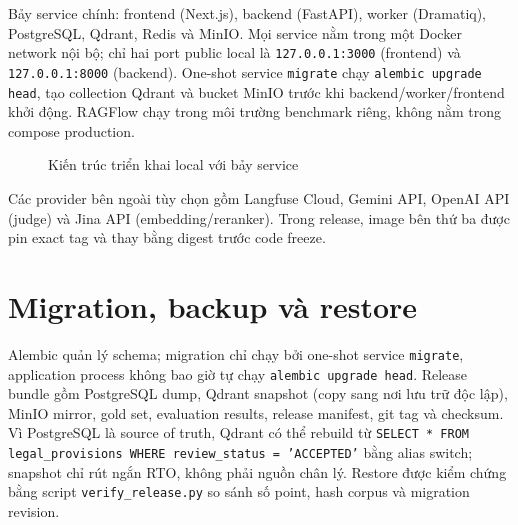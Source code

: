 \documentclass[a4paper,12pt]{extreport}
\newcommand{\code}[1]{\texttt{#1}}
\begin{document}
\begin{sloppypar}
Bảy service chính: frontend (Next.js), backend (FastAPI), worker (Dramatiq), PostgreSQL, Qdrant, Redis và MinIO. Mọi service nằm trong một Docker network nội bộ; chỉ hai port public local là \code{127.0.0.1:3000} (frontend) và \code{127.0.0.1:8000} (backend). One-shot service \code{migrate} chạy \code{alembic upgrade head}, tạo collection Qdrant và bucket MinIO trước khi backend/worker/frontend khởi động. RAGFlow chạy trong môi trường benchmark riêng, không nằm trong compose production.
\end{sloppypar}

\begin{figure}[H]
\centering
{}
\caption{Kiến trúc triển khai local với bảy service}
\end{figure}

Các provider bên ngoài tùy chọn gồm Langfuse Cloud, Gemini API, OpenAI API (judge) và Jina API (embedding/reranker). Trong release, image bên thứ ba được pin exact tag và thay bằng digest trước code freeze.

\section{Migration, backup và restore}

\begin{sloppypar}
Alembic quản lý schema; migration chỉ chạy bởi one-shot service \code{migrate}, application process không bao giờ tự chạy \code{alembic upgrade head}. Release bundle gồm PostgreSQL dump, Qdrant snapshot (copy sang nơi lưu trữ độc lập), MinIO mirror, gold set, evaluation results, release manifest, git tag và checksum. Vì PostgreSQL là source of truth, Qdrant có thể rebuild từ \code{SELECT * FROM legal\_provisions WHERE review\_status = 'ACCEPTED'} bằng alias switch; snapshot chỉ rút ngắn RTO, không phải nguồn chân lý. Restore được kiểm chứng bằng script \code{verify\_release.py} so sánh số point, hash corpus và migration revision.
\end{sloppypar}
\end{document}
